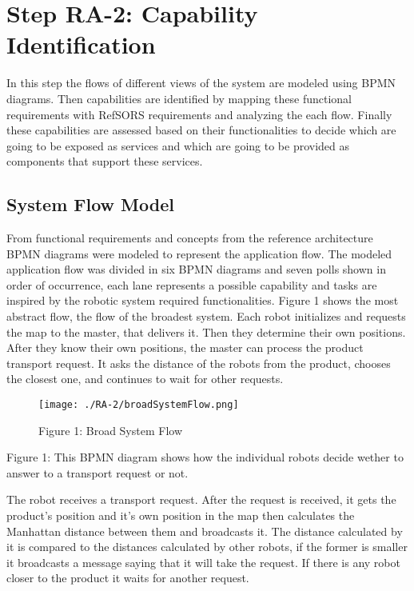 \section{Step RA-2: Capability Identification}
In this step the flows of different views of the system are modeled using BPMN diagrams. Then capabilities are identified by mapping these functional requirements with RefSORS requirements and analyzing the each flow. Finally these capabilities are assessed based on their functionalities to decide which are going to be exposed as services and which are going to be provided as components that support these services.

\subsection{System Flow Model}
From functional requirements and concepts from the reference architecture BPMN diagrams were modeled to represent the application flow. The modeled application flow was divided in six BPMN diagrams and seven polls shown in order of occurrence, each lane represents a possible capability and tasks are inspired by the robotic system required functionalities.
Figure 1 shows the most abstract flow, the flow of the broadest system. Each robot initializes and requests the map to the master, that delivers it. Then they determine their own positions. After they know their own positions, the master can process the product transport request. It asks the distance of the robots from the product, chooses the closest one, and continues to wait for other requests.

\begin{figure}[ht!]
 \centering
 \texttt{[image: ./RA-2/broadSystemFlow.png]}
 \caption{Figure 1: Broad System Flow}
 \label{fig:broadsystemflow}
\end{figure}

Figure 1: This BPMN diagram shows how the individual robots decide wether to answer to a transport request or not.

The robot receives a transport request. After the request is received, it gets the product's position and it's own position in the map then calculates the Manhattan distance between them and broadcasts it. The distance calculated by it is compared to the distances calculated by other robots, if the former is smaller it broadcasts a message saying that it will take the request. If there is any robot closer to the product it waits for another request.




